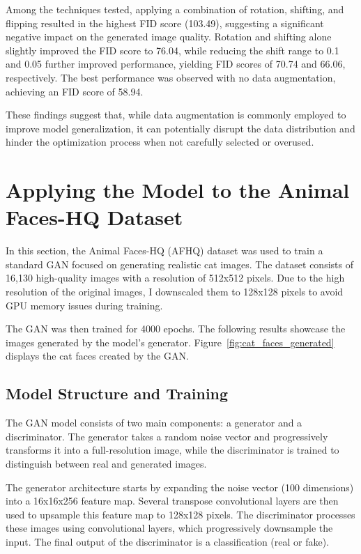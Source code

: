 Among the techniques tested, applying a combination of rotation, shifting, and flipping resulted in the highest FID score (103.49), suggesting a significant negative impact on the generated image quality. Rotation and shifting alone slightly improved the FID score to 76.04, while reducing the shift range to 0.1 and 0.05 further improved performance, yielding FID scores of 70.74 and 66.06, respectively. The best performance was observed with no data augmentation, achieving an FID score of 58.94.

These findings suggest that, while data augmentation is commonly employed to improve model generalization, it can potentially disrupt the data distribution and hinder the optimization process when not carefully selected or overused.


\section{Applying the Model to the Animal Faces-HQ Dataset}

In this section, the Animal Faces-HQ (AFHQ) dataset was used to train a standard GAN focused on generating realistic cat images. The dataset consists of 16,130 high-quality images with a resolution of 512x512 pixels. Due to the high resolution of the original images, I downscaled them to 128x128 pixels to avoid GPU memory issues during training.

The GAN was then trained for 4000 epochs. The following results showcase the images generated by the model's generator. Figure~\ref{fig:cat_faces_generated} displays the cat faces created by the GAN.

\subsection{Model Structure and Training}

The GAN model consists of two main components: a generator and a discriminator. The generator takes a random noise vector and progressively transforms it into a full-resolution image, while the discriminator is trained to distinguish between real and generated images.

The generator architecture starts by expanding the noise vector (100 dimensions) into a 16x16x256 feature map. Several transpose convolutional layers are then used to upsample this feature map to 128x128 pixels. The discriminator processes these images using convolutional layers, which progressively downsample the input. The final output of the discriminator is a classification (real or fake).


